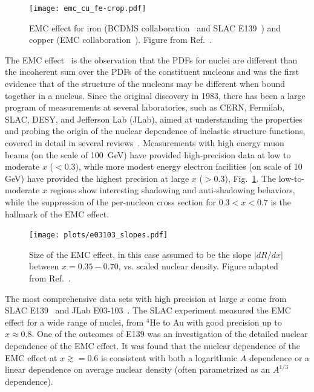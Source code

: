 \begin{figure}[tbp]
\centering\texttt{[image: emc\_cu\_fe-crop.pdf]}
\caption{EMC effect for iron (BCDMS collaboration~\cite{Benvenuti:1987az} and SLAC E139~\cite{Gomez:1993ri}) and copper (EMC collaboration~\cite{Ashman:1992kv}).
Figure from Ref.~\cite{Guzey:2012yk}.}
\label{fig:emc_iron}
\end{figure}

The EMC effect~\cite{Aubert:1983xm} is the observation that the PDFs for nuclei are different than
the incoherent sum over the PDFs of the constituent nucleons and was the first evidence that 
of the structure of the nucleons may be different when bound together in a nucleus.
Since the original discovery in 1983, there has been a large
program of measurements at several laboratories, such as CERN, Fermilab, SLAC, DESY, and Jefferson Lab (JLab),
aimed at understanding the properties and probing the origin of the nuclear dependence of inelastic
structure functions, covered in detail in several reviews~\cite{Arneodo:1992wf,Geesaman:1995yd,Sargsian:2002wc,Malace:2014uea, Hen:2016kwk}.
Measurements with high energy muon beams (on the scale of 100~GeV) have provided high-precision data at low to
moderate $x$ ($<0.3$), while more modest energy electron facilities (on scale of 10 GeV) have provided
the highest precision at large $x$ ($>0.3$), Fig.~\ref{fig:emc_iron}.  The low-to-moderate $x$
regions show interesting shadowing and anti-shadowing behaviors, while the suppression of the
per-nucleon cross section for $0.3<x<0.7$ is the hallmark of the EMC effect.

\begin{figure}[tbp]
\centering\texttt{[image: plots/e03103\_slopes.pdf]}
\caption{Size of the EMC effect, in this case assumed to be the slope $|dR/dx|$ between $x=0.35-0.70$, vs. scaled nuclear density. Figure adapted from Ref.~\cite{Seely:2009gt}.}
\label{fig:emc_jlab_hallc}
\end{figure}

The most comprehensive data sets with high precision at large $x$ come from SLAC E139~\cite{Gomez:1993ri} and JLab E03-103~\cite{Seely:2009gt}. The SLAC experiment
measured the EMC effect for a wide range of nuclei, from $^4$He to Au with good precision up to
$x\approx0.8$.  One of the outcomes of E139 was an investigation of the detailed nuclear dependence of the EMC
effect. It was found that the nuclear dependence of the EMC effect at $x \gtrsim =0.6$ is consistent
with both a logarithmic $A$ dependence or a linear dependence on average nuclear density (often parametrized as an $A^{1/3}$ dependence).

